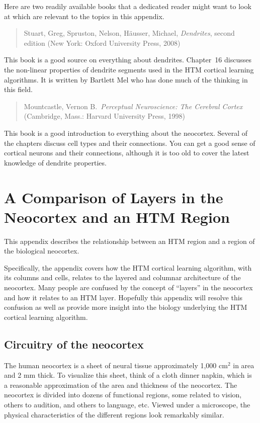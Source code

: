 \documentclass{report}
\begin{document}
Here are two readily available books that a dedicated reader might
want to look at which are relevant to the topics in this appendix.

\begin{quote}
Stuart, Greg, Spruston, Nelson, H\"ausser, Michael, {\em Dendrites},
second edition (New York: Oxford University Press, 2008)
\end{quote}

This book is a good source on everything about dendrites. Chapter~16
discusses the non-linear properties of dendrite segments used in the
HTM cortical learning algorithms. It is written by Bartlett Mel who
has done much of the thinking in this field.

\begin{quote}
Mountcastle, Vernon B.~{\em Perceptual Neuroscience: The Cerebral
  Cortex} (Cambridge, Mass.: Harvard University Press, 1998)
\end{quote}

This book is a good introduction to everything about the
neocortex. Several of the chapters discuss cell types and their
connections. You can get a good sense of cortical neurons and their
connections, although it is too old to cover the latest knowledge of
dendrite properties.

\chapter{A Comparison of Layers in the Neocortex and an HTM Region}
\label{appendix:compare-layer-region}

This appendix describes the relationship between an HTM region and a
region of the biological neocortex.

Specifically, the appendix covers how the HTM cortical learning
algorithm, with its columns and cells, relates to the layered and
columnar architecture of the neocortex. Many people are confused by
the concept of ``layers'' in the neocortex and how it relates to an
HTM layer. Hopefully this appendix will resolve this confusion as well
as provide more insight into the biology underlying the HTM cortical
learning algorithm.

\section*{Circuitry of the neocortex}

The human neocortex is a sheet of neural tissue approximately 1,000
cm$^2$ in area and 2 mm thick. To visualize this sheet, think of a
cloth dinner napkin, which is a reasonable approximation of the area
and thickness of the neocortex. The neocortex is divided into dozens
of functional regions, some related to vision, others to audition, and
others to language, etc. Viewed under a microscope, the physical
characteristics of the different regions look remarkably similar.
\end{document}
